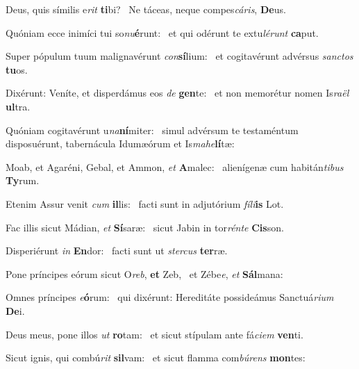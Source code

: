 \item Deus, quis símilis e\textit{rit} \textbf{ti}bi?~\psstar{} Ne táceas, neque compes\textit{cáris}, \textbf{De}us.

\item Quóniam ecce inimíci tui so\textit{nu}\textbf{é}runt:~\psstar{} et qui odérunt te extu\textit{lérunt} \textbf{ca}put.

\item Super pópulum tuum malignavérunt \textit{con}\textbf{sí}lium:~\psstar{} et cogitavérunt advérsus \textit{sanctos} \textbf{tu}os.

\item Dixérunt: Veníte, et disperdámus eos \textit{de} \textbf{gen}te:~\psstar{} et non memorétur nomen Is\textit{raël} \textbf{ul}tra.

\item Quóniam cogitavérunt u\textit{na}\textbf{ní}miter:~\psstar{} simul advérsum te testaméntum disposuérunt, tabernácula Idumæórum et Is\textit{mahe}\textbf{lí}tæ:

\item Moab, et Agaréni, Gebal, et Ammon, \textit{et} \textbf{A}malec:~\psstar{} alienígenæ cum habitán\textit{tibus} \textbf{Ty}rum.

\item Etenim Assur venit \textit{cum} \textbf{il}lis:~\psstar{} facti sunt in adjutórium \textit{fíli}\textbf{is} Lot.

\item Fac illis sicut Mádian, \textit{et} \textbf{Sí}saræ:~\psstar{} sicut Jabin in tor\textit{rénte} \textbf{Cis}son.

\item Disperiérunt \textit{in} \textbf{En}dor:~\psstar{} facti sunt ut \textit{stercus} \textbf{ter}ræ.

\item Pone príncipes eórum sicut O\textit{reb}, \textbf{et} Zeb,~\psstar{} et Zébe\textit{e}, \textit{et} \textbf{Sál}mana:

\item Omnes príncipes \textit{e}\textbf{ó}rum:~\psstar{} qui dixérunt: Hereditáte possideámus Sanctuá\textit{rium} \textbf{De}i.

\item Deus meus, pone illos \textit{ut} \textbf{ro}tam:~\psstar{} et sicut stípulam ante fá\textit{ciem} \textbf{ven}ti.

\item Sicut ignis, qui combú\textit{rit} \textbf{sil}vam:~\psstar{} et sicut flamma com\textit{búrens} \textbf{mon}tes:

